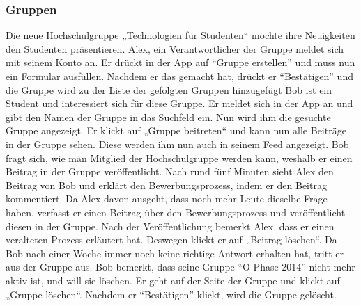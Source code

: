 \documentclass[parskip=full]{scrartcl}
\begin{document}
		\subsubsection{Gruppen}
		Die neue Hochschulgruppe „Technologien für Studenten“ möchte ihre Neuigkeiten den Studenten präsentieren. Alex, ein Verantwortlicher der Gruppe meldet sich mit seinem Konto an. Er drückt in der App auf “Gruppe erstellen” und muss nun ein Formular ausfüllen. Nachdem er das gemacht hat, drückt er “Bestätigen” und die Gruppe wird zu der Liste der gefolgten Gruppen hinzugefügt %
		Bob ist ein Student und interessiert sich für diese Gruppe. Er meldet sich in der App an und gibt den Namen der Gruppe in das Suchfeld ein. Nun wird ihm die gesuchte Gruppe angezeigt. Er klickt auf „Gruppe beitreten“ und kann nun alle Beiträge in der Gruppe sehen. Diese werden ihm nun auch in seinem Feed angezeigt. Bob fragt sich, wie man Mitglied der Hochschulgruppe werden kann, weshalb er einen Beitrag in der Gruppe veröffentlicht. Nach rund fünf Minuten sieht Alex den Beitrag von Bob und erklärt den Bewerbungsprozess, indem er den Beitrag kommentiert. Da Alex davon ausgeht, dass noch mehr Leute dieselbe Frage haben, verfasst er einen Beitrag über den Bewerbungsprozess und veröffentlicht diesen in der Gruppe. Nach der Veröffentlichung bemerkt Alex, dass er einen veralteten Prozess erläutert hat. Deswegen klickt er auf „Beitrag löschen“.
		Da Bob nach einer Woche immer noch keine richtige Antwort erhalten hat, tritt er aus der Gruppe aus.
		Bob bemerkt, dass seine Gruppe “O-Phase 2014” nicht mehr aktiv ist, und will sie löschen. Er geht auf der Seite der Gruppe und klickt auf „Gruppe löschen“. Nachdem er “Bestätigen” klickt, wird die Gruppe gelöscht.
		
\end{document}
